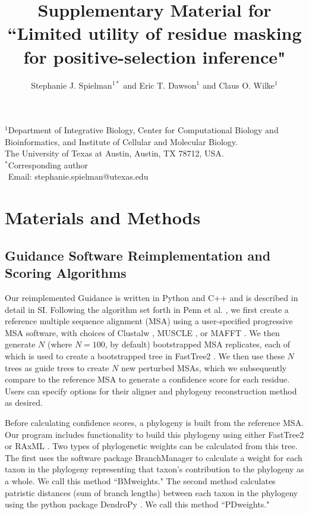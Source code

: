 \documentclass[11pt]{article}
\begin{document}
\title{\textbf{Supplementary Material for ``Limited utility of residue masking for positive-selection inference"}}
\author{Stephanie J. Spielman$^{1*}$ and Eric T. Dawson$^{1}$ and Claus O. Wilke$^{1}$}
\date{}
\maketitle
\noindent $^1$Department of Integrative Biology, Center for Computational Biology and Bioinformatics, and Institute of Cellular and Molecular Biology.
\\ The University of Texas at Austin, Austin, TX 78712, USA.\\

\bigskip
\noindent
$^*$Corresponding author\\
$\phantom{^*}$Email: stephanie.spielman@utexas.edu\\

\bigskip
\tableofcontents

\newpage 

\section{Materials and Methods}

\subsection*{Guidance Software Reimplementation and Scoring Algorithms}
Our reimplemented Guidance is written in Python and C++ and is described in detail in SI. Following the algorithm set forth in Penn et al. \citep{Penn2010}, we first create a reference multiple sequence alignment (MSA) using a user-specified progressive MSA software, with choices of Clustalw \citep{Thompson1994}, MUSCLE \citep{Edgar2004}, or MAFFT \citep{Katoh2002, Katoh2005}. We then generate $N$ (where $N=100$, by default) bootstrapped MSA replicates, each of which is used to create a bootstrapped tree in FastTree2 \citep{Price2010}. We then use these $N$ trees as guide trees to create $N$ new perturbed MSAs, which we subsequently compare to the reference MSA to generate a confidence score for each residue. Users can specify options for their aligner and phylogeny reconstruction method as desired.

Before calculating confidence scores, a phylogeny is built from the reference MSA. Our program includes functionality to build this phylogeny using either FastTree2 \citep{Price2010} or RAxML \citep{Stamatakis2006}. Two types of phylogenetic weights can be calculated from this tree. The first uses the software package BranchManager \citep{Stone2007} to calculate a weight for each taxon in the phylogeny representing that taxon's contribution to the phylogeny as a whole. We call this method ``BMweights." The second method calculates patristic distances (sum of branch lengths) between each taxon in the phylogeny using the python package DendroPy \citep{Sukumaran2010}. We call this method ``PDweights."
\end{document}
